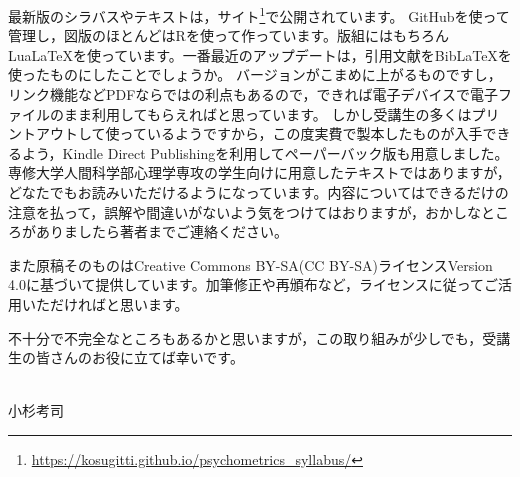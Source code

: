 最新版のシラバスやテキストは，サイト\footnote{\url{https://kosugitti.github.io/psychometrics_syllabus/}}で公開されています。
GitHubを使って管理し，図版のほとんどはRを使って作っています。版組にはもちろんLua\LaTeX を使っています。一番最近のアップデートは，引用文献をBib\LaTeX を使ったものにしたことでしょうか。
バージョンがこまめに上がるものですし，リンク機能などPDFならではの利点もあるので，できれば電子デバイスで電子ファイルのまま利用してもらえればと思っています。
しかし受講生の多くはプリントアウトして使っているようですから，この度実費で製本したものが入手できるよう，Kindle Direct Publishingを利用してペーパーバック版も用意しました。
専修大学人間科学部心理学専攻の学生向けに用意したテキストではありますが，どなたでもお読みいただけるようになっています。内容についてはできるだけの注意を払って，誤解や間違いがないよう気をつけてはおりますが，おかしなところがありましたら著者までご連絡ください。

また原稿そのものはCreative Commons BY-SA(CC BY-SA)ライセンスVersion 4.0に基づいて提供しています。加筆修正や再頒布など，ライセンスに従ってご活用いただければと思います。


不十分で不完全なところもあるかと思いますが，この取り組みが少しでも，受講生の皆さんのお役に立てば幸いです。

\begin{flushright}
	\date{\today}\\
	小杉考司
\end{flushright}

